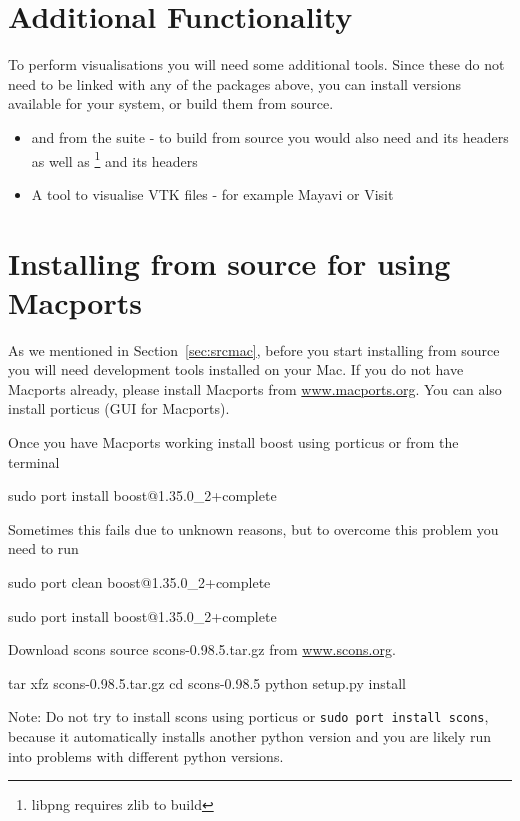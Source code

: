 \section{Additional Functionality}\label{sec:macaddfunc}
To perform visualisations you will need some additional tools.
Since these do not need to be linked with any of the packages above, you can install versions available for your
system, or build them from source.
\begin{itemize}
\item {} and  from the  suite - to build from source 
you would also need  and its headers as well as \footnote{libpng requires zlib to build} and its headers
\item A tool to visualise VTK files - for example Mayavi or Visit
\end{itemize}


\section{Installing from source for \macosx using Macports}
\label{sec:srcmacports}

As we mentioned in Section~\ref{sec:srcmac}, before you start installing from source you will need \macosx development tools installed on your Mac. 
If you do not have Macports already, please install Macports from \url{www.macports.org}. You can also install porticus (GUI for Macports).
 
Once you have Macports working install boost using porticus or from the terminal 
\begin{shellCode}
sudo port install boost@1.35.0_2+complete
\end{shellCode}
Sometimes this fails due to unknown reasons, but to overcome this problem you need to run
\begin{shellCode}
sudo port clean boost@1.35.0_2+complete

sudo port install boost@1.35.0_2+complete
 \end{shellCode}
  
Download scons source scons-0.98.5.tar.gz from \url{www.scons.org}.
\begin{shellCode}
tar xfz scons-0.98.5.tar.gz
cd scons-0.98.5
python setup.py install
\end{shellCode}

Note: Do not try to install scons using porticus or \texttt{sudo port install scons}, because it automatically installs another python version and you are likely run into problems with different python versions.  
 
